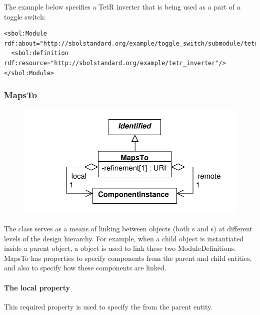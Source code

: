 The example below specifies a TetR inverter that is being used as
a part of a toggle switch:

\begin{lstlisting}
<sbol:Module rdf:about="http://sbolstandard.org/example/toggle_switch/submodule/tetr_inverter">
  <sbol:definition rdf:resource="http://sbolstandard.org/example/tetr_inverter"/>
</sbol:Module>
\end{lstlisting}


\subsubsection{MapsTo}
\label{sec:MapsTo}

\begin{figure}[ht]
\begin{center}
\includegraphics[scale=0.6]{uml/maps_to}
\caption[]{}
\label{uml:maps_to}
\end{center}
\end{figure}
The  class serves as a means of linking between  objects (both s and s) at different levels of the design hierarchy. For example, when a child  object is instantiated inside a parent  object, a  object is used to link these two ModuleDefinitions. MapsTo has properties to specify components from the parent and child entities, and also to specify how these components are linked.


\paragraph{The local property}
This required property is used to specify the  from the parent entity.

